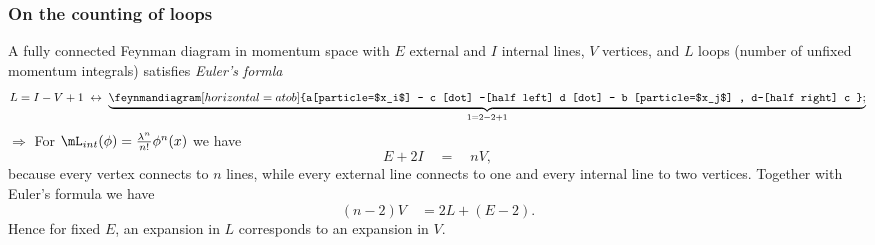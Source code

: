 \subsubsection{On the counting of loops}
A fully connected Feynman diagram in momentum space with $E$ external and $I$ internal lines, $V$ vertices, and $L$ loops (number of unfixed momentum integrals) satisfies \emph{Euler's formla}
\begin{equation}
	L = I-V+1 \; \leftrightarrow \; \underbrace{\feynmandiagram[horizontal=a to b] {a[particle=$x_i$] -- c [dot] --[half left] d [dot] -- b [particle=$x_j$] , d--[half right] c  };				}_{1= 2-2+1}
\end{equation}
$\Rightarrow$ For $\mL_{int}(\phi) = \frac{\lambda^n}{n!} \phi^n(x)$ we have
\begin{equation}
	E + 2 I \quad = \quad nV,
\end{equation}
because every vertex connects to $n$ lines, while every external line connects to one and every internal line to two vertices. Together with Euler's formula we have
\begin{equation}
	(n-2)V \quad = 2L + (E-2).
\end{equation}
Hence for fixed $E$, an expansion in $L$ corresponds to an expansion in $V$.





